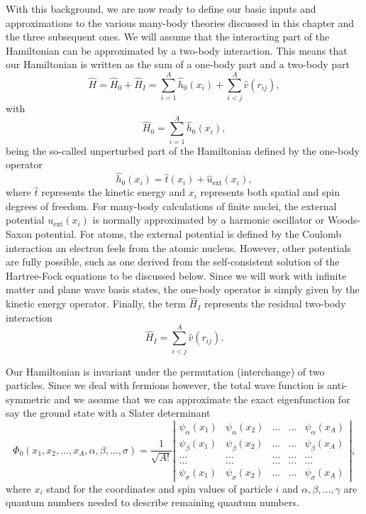 With this background, we are now ready to define our basic inputs and
approximations to the various many-body theories discussed in this
chapter and the three subsequent ones.  We will assume that the
interacting part of the Hamiltonian can be approximated by a two-body
interaction.  This means that our Hamiltonian is written as the sum of
a one-body part and a two-body part
\begin{equation}
    \hat{H} = \hat{H}_0 + \hat{H}_I = \sum_{i=1}^A \hat{h}_0(x_i) +
    \sum_{i < j}^A \hat{v}(r_{ij}),
\label{Hnuclei}
\end{equation}
with
\begin{equation}
  \hat{H}_0=\sum_{i=1}^A \hat{h}_0(x_i), 
\label{hinuclei}
\end{equation}
being the so-called unperturbed part of the Hamiltonian defined by the one-body operator
\[
\hat{h}_0(x_i)=\hat{t}(x_i) + \hat{u}_{\mathrm{ext}}(x_i),
\]
where $\hat{t}$ represents the kinetic energy and $x_i$ represents
both spatial and spin degrees of freedom.  For many-body calculations
of finite nuclei, the external potential $u_{\mathrm{ext}}(x_i)$ is
normally approximated by a harmonic oscillator or Woods-Saxon
potential. For atoms, the external potential is defined by the Coulomb
interaction an electron feels from the atomic nucleus. However, other
potentials are fully possible, such as one derived from the
self-consistent solution of the Hartree-Fock equations to be discussed
below. Since we will work with infinite matter and plane wave basis states, the one-body operator is
simply given by the kinetic energy operator.
Finally, the term $\hat{H}_I$ represents the residual two-body interaction 
\[
  \hat{H}_I= \sum_{i < j}^A \hat{v}(r_{ij}).
\]

Our Hamiltonian is invariant under the permutation (interchange) of
two particles.  Since we deal with fermions however, the total wave
function is anti-symmetric and we assume that we can approximate the exact eigenfunction
for say the ground state with a Slater determinant
\begin{equation}
   \Phi_0(x_1, x_2,\dots ,x_A,\alpha,\beta,\dots,
   \sigma)=\frac{1}{\sqrt{A!}}  \left| \begin{array}{ccccc}
     \psi_{\alpha}(x_1)& \psi_{\alpha}(x_2)& \dots & \dots &
     \psi_{\alpha}(x_A)\\ \psi_{\beta}(x_1)&\psi_{\beta}(x_2)& \dots &
     \dots & \psi_{\beta}(x_A)\\ \dots & \dots & \dots & \dots & \dots
     \\ \dots & \dots & \dots & \dots & \dots
     \\ \psi_{\sigma}(x_1)&\psi_{\sigma}(x_2)& \dots & \dots &
     \psi_{\sigma}(x_A)\end{array} \right|, \label{eq:HartreeFockDet}
\end{equation}
where $x_i$ stand for the coordinates and spin values of particle
$i$ and $\alpha,\beta,\dots, \gamma$ are quantum numbers needed to
describe remaining quantum numbers.


